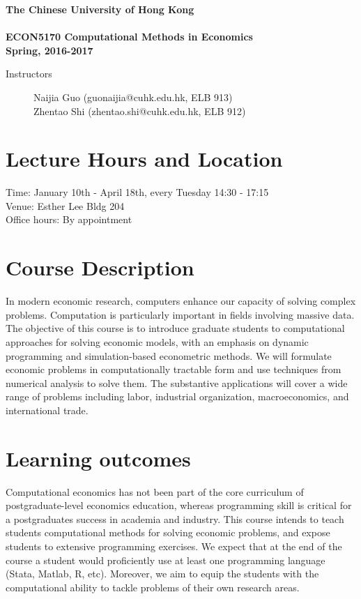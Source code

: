 \documentclass[11pt]{article}
\begin{document}
\begin{center}
  {\Large\bf The Chinese University of Hong Kong \\
  \ \\
ECON5170  Computational Methods in Economics \\
Spring, 2016-2017}
\end{center}

 \vspace{2pt}

\begin{description}
\item[Instructors] Naijia Guo (guonaijia@cuhk.edu.hk, ELB 913) \\
  Zhentao Shi (zhentao.shi@cuhk.edu.hk, ELB 912)
\end{description}

\section{Lecture Hours and Location}
Time: January 10th - April 18th, every Tuesday 14:30 - 17:15 \\
Venue: Esther Lee Bldg 204 \\
Office hours: By appointment




\section{Course Description}

In modern economic research, computers enhance our capacity of solving complex problems. Computation is particularly important in fields involving massive data. The objective of this course is to introduce graduate students to computational approaches for solving economic models, with an emphasis on dynamic programming and simulation-based econometric methods. We will formulate economic problems in computationally tractable form and use techniques from numerical analysis to solve them. The substantive applications will cover a wide range of problems including labor, industrial organization, macroeconomics, and international trade.

\section{Learning outcomes}

Computational economics has not been part of the core curriculum of postgraduate-level economics education, whereas programming skill is critical for a postgraduates success in academia and industry. This course intends to teach students computational methods for solving economic problems, and expose students to extensive programming exercises. We expect that at the end of the course a student would proficiently use at least one programming language (Stata, Matlab, R, etc). Moreover, we aim to equip the students with the computational ability to tackle problems of their own research areas.
\end{document}
